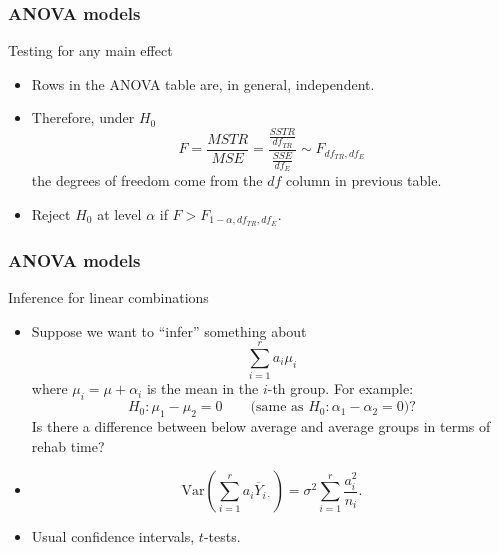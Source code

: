 \documentclass[handout]{beamer}
\begin{document}

   \begin{frame} \frametitle{ANOVA models}

   \begin{block}
   {Testing for any main effect}
   \begin{itemize}

   \item Rows in the ANOVA table are, in general, independent.

   \item Therefore, under $H_0$
   $$
   F = \frac{MSTR}{MSE} = \frac{\frac{SSTR}{df_{TR}}}{\frac{SSE}{df_{E}}} \sim F_{df_{TR}, df_E}$$
   the degrees of freedom come from the $df$ column in previous table.
   \item Reject $H_0$ at level $\alpha$ if $F > F_{1-\alpha, df_{TR}, df_{E}}.$
   \end{itemize}
   \end{block}
   \end{frame}


   \begin{frame} \frametitle{ANOVA models}

   \begin{block}
   {Inference for linear combinations                     }
   \begin{itemize}

   \item Suppose we want to ``infer'' something about
   $$
   \sum_{i=1}^r a_i \mu_i$$
   where $\mu_i = \mu+\alpha_i$ is the mean in the $i$-th group.
   For example:
   $$
   H_0:\mu_1-\mu_2=0 \qquad \text{(same as $H_0:\alpha_1-\alpha_2=0$)}?$$
   Is there a difference between below average and average groups in terms of rehab time?
   \item $$
   \text{Var}\left(\sum_{i=1}^r a_i \overline{Y}_{i\cdot} \right) = \sigma^2 \sum_{i=1}^r \frac{a_i^2}{n_i}.$$

   \item Usual confidence intervals, $t$-tests.

   \end{itemize}
   \end{block}
   \end{frame}

\end{document}
